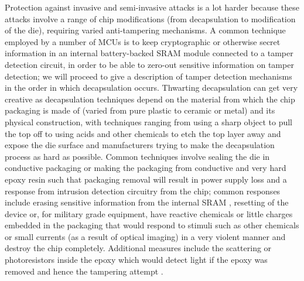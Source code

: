 Protection against invasive and semi-invasive attacks is a lot harder because these attacks involve a range of chip modifications (from decapsulation to modification of the die), requiring varied anti-tampering mechanisms. A common technique employed by a number of MCUs is to keep cryptographic or otherwise secret information in an internal battery-backed SRAM \citep{hwre} \citep{sergei:thesis} module connected to a tamper detection circuit, in order to be able to zero-out sensitive information on tamper detection; we will proceed to give a description of tamper detection mechanisms in the order in which decapsulation occurs. Thwarting decapsulation can get very creative as decapsulation techniques depend on the material from which the chip packaging is made of (varied from pure plastic to ceramic or metal) and its physical construction, with techniques ranging from using a sharp object to pull the top off \citep{sergei:thesis} to using acids and other chemicals \citep{hwre} \citep{sergei:thesis} to etch the top layer away and expose the die surface and manufacturers trying to make the decapsulation process as hard as possible. Common techniques involve sealing the die in conductive packaging or making the packaging from conductive and very hard epoxy resin such that packaging removal will result in power supply loss and a response from intrusion detection circuitry from the chip; common responses include erasing sensitive information from the internal SRAM \citep{hwre}, resetting of the device \citep{sergei:thesis} or, for military grade equipment, have reactive chemicals or little charges embedded in the packaging that would respond to stimuli such as other chemicals or small currents (as a result of optical imaging) in a very violent manner and destroy the chip completely. Additional measures include the scattering or photoresistors inside the epoxy which would detect light if the epoxy was removed and hence the tampering attempt \citep{sergei:thesis} \citep{hwre}.

